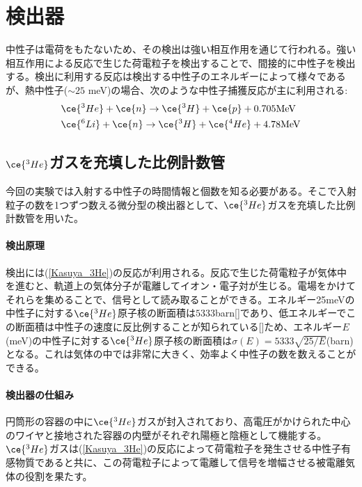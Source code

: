 \section{検出器}
中性子は電荷をもたないため、その検出は強い相互作用を通じて行われる。強い相互作用による反応で生じた荷電粒子を検出することで、間接的に中性子を検出する。検出に利用する反応は検出する中性子のエネルギーによって様々であるが、熱中性子($\sim 25$ meV)の場合、次のような中性子捕獲反応が主に利用される:
\begin{align}
&\ce{^3He} + \ce{n} \to \ce{^3H}+\ce{p} + 0.705 \mathrm{MeV} \label{Kasuya_3He} \\
&\ce{^6Li} + \ce{n} \to \ce{^3H}+\ce{^4He}+4.78 \mathrm{MeV} \label{Kasuya_6Li}
\end{align}

\subsection{$\ce{^3He}$ガスを充填した比例計数管}
今回の実験では入射する中性子の時間情報と個数を知る必要がある。そこで入射粒子の数を1つずつ数える微分型の検出器として、$\ce{^3He}$ガスを充填した比例計数管を用いた。

\paragraph{検出原理}
検出には(\ref{Kasuya_3He})の反応が利用される。反応で生じた荷電粒子が気体中を進むと、軌道上の気体分子が電離してイオン・電子対が生じる。電場をかけてそれらを集めることで、信号として読み取ることができる。エネルギー25meVの中性子に対する$\ce{^3He}$原子核の断面積は$5333$barn[]であり、低エネルギーでこの断面積は中性子の速度に反比例することが知られている[]ため、エネルギー$E$(meV)の中性子に対する$\ce{^3He}$原子核の断面積は$\sigma(E)=5333\sqrt{25/E}$(barn)となる。これは気体の中では非常に大きく、効率よく中性子の数を数えることができる。

\paragraph{検出器の仕組み}
円筒形の容器の中に$\ce{^3He}$ガスが封入されており、高電圧がかけられた中心のワイヤと接地された容器の内壁がそれぞれ陽極と陰極として機能する。$\ce{^3He}$ガスは(\ref{Kasuya_3He})の反応によって荷電粒子を発生させる中性子有感物質であると共に、この荷電粒子によって電離して信号を増幅させる被電離気体の役割を果たす。

